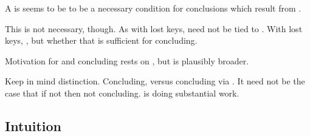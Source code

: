 \begin{note}
  A \requ{} is seems to be to be a necessary condition for conclusions which result from .

  This is not necessary, though.
  As with lost keys, \requ{} need not be tied to .
  With lost keys, , but whether that is sufficient for concluding.

  Motivation for  and concluding rests on , but is plausibly broader.
\end{note}

\begin{note}
  Keep in mind distinction.
  Concluding, versus concluding via .
  It need not be the case that if not  then not concluding.
  \requ{} is doing substantial work.
\end{note}

\subsection{Intuition}
\label{sec:intuition-1}

